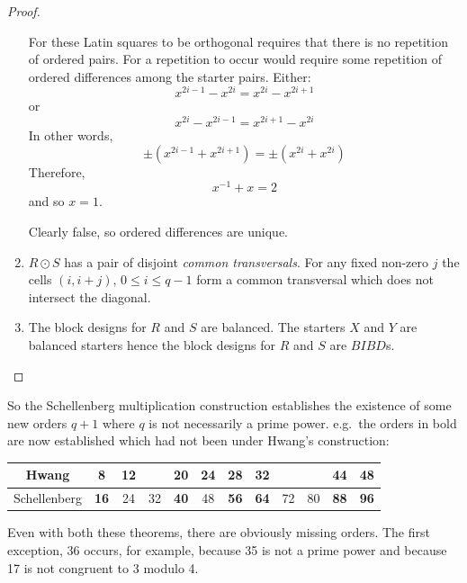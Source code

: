 \documentclass[
  11pt,
  a4paper]{book}
\newcounter{example}
\begin{document}
\begin{proof}
\begin{enumerate}
{      For these Latin
      squares to be orthogonal requires that there is no
      repetition of ordered pairs.  For a repetition to
      occur would require some repetition of ordered
      differences among the starter pairs.  Either:
      \begin{equation}
        x^{2i - 1} - x^{2i} = x^{2i} - x^{2i + 1}
      \end{equation}
      or
      \begin{equation}
        x^{2i} - x^{2i-1} = x^{2i+1} - x^{2i}
      \end{equation}
      In other words,
      \begin{equation}
       \pm (x^{2i - 1} + x^{2i + 1}) = \pm (x^{2i} + x^{2i})
      \end{equation}
      Therefore,
      \begin{equation}
        x^{-1} + x = 2
      \end{equation}
      and so $x = 1$.

      Clearly false, so ordered differences are unique.}
  \item{$R \odot S$ has a pair of disjoint \emph{common transversals}.
      For any fixed non-zero $j$ the cells
      $(i, i + j)$, $0 \leq i \leq q - 1$ form a common
      transversal which does not intersect the diagonal.}
  \item{The block designs for $R$ and $S$ are balanced. The
      starters $X$ and $Y$ are balanced starters hence the
      block designs for $R$ and $S$ are $BIBD$s.}
  \end{enumerate}
\end{proof}

So the Schellenberg multiplication construction establishes the
existence of some new orders \(q + 1\) where \(q\) is not necessarily a
prime power. e.g.~the orders in bold are now established which had not
been under Hwang's construction:

\begin{center}
  \begin{tabular}{|c|c|c|c|c|c|c|c|c|c|c|c|}
  \hline
     Hwang     &  8 & 12 &    & 20 & 24 & 28 & 32 &    &    & 44 & 48 \\ \hline
  Schellenberg & \textbf{16} & 24 & 32 & \textbf{40} & 48 & \textbf{56} & \textbf{64} & 72 & 80 & \textbf{88} & \textbf{96} \\ \hline
  \end{tabular}
\end{center}

Even with both these theorems, there are obviously missing orders. The
first exception, 36 occurs, for example, because 35 is not a prime power
and because 17 is not congruent to 3 modulo 4.
\end{document}
